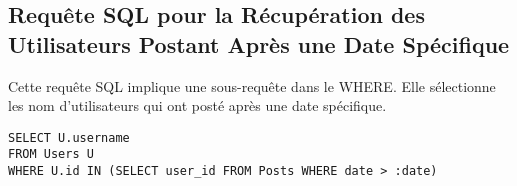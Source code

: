 \subsection{Requête SQL pour la Récupération des Utilisateurs Postant Après une Date Spécifique}

Cette requête SQL implique une sous-requête dans le WHERE. Elle sélectionne les nom d'utilisateurs qui ont posté après une date spécifique.

\begin{lstlisting}
SELECT U.username
FROM Users U
WHERE U.id IN (SELECT user_id FROM Posts WHERE date > :date)
\end{lstlisting}